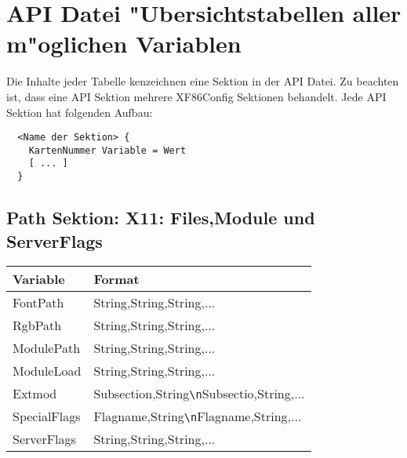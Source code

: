 \section{API Datei "Ubersichtstabellen aller m"oglichen Variablen}
Die Inhalte jeder Tabelle kenzeichnen eine Sektion in der API Datei. 
Zu beachten ist, dass eine API Sektion mehrere XF86Config Sektionen 
behandelt. Jede API Sektion hat folgenden Aufbau:
\begin{verbatim}
  <Name der Sektion> {
    KartenNummer Variable = Wert
    [ ... ]
  }
\end{verbatim}

\subsection{Path Sektion: X11: Files,Module und ServerFlags}
\begin{tabular}[h]{|p{5cm}|p{7cm}|}
 \hline
 \textbf{Variable}  & \textbf{Format}                \\
 \hline
 FontPath     & String,String,String,...                       \\
 RgbPath      & String,String,String,...                       \\ 
 ModulePath   & String,String,String,...                       \\
 ModuleLoad   & String,String,String,...                       \\
 Extmod       & Subsection,String\verb+\n+Subsectio,String,... \\ 
 SpecialFlags & Flagname,String\verb+\n+Flagname,String,...    \\
 ServerFlags  & String,String,String,...                       \\
 \hline
\end{tabular}

